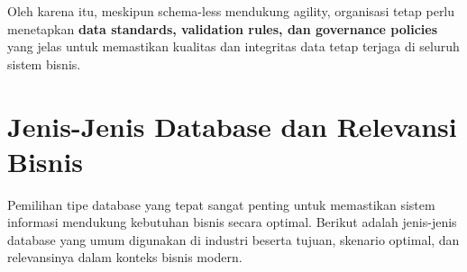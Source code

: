 Oleh karena itu, meskipun schema-less mendukung agility, organisasi tetap perlu menetapkan \textbf{data standards, validation rules, dan governance policies} yang jelas untuk memastikan kualitas dan integritas data tetap terjaga di seluruh sistem bisnis.



\section{Jenis-Jenis Database dan Relevansi Bisnis}

Pemilihan tipe database yang tepat sangat penting untuk memastikan sistem informasi mendukung kebutuhan bisnis secara optimal. Berikut adalah jenis-jenis database yang umum digunakan di industri beserta tujuan, skenario optimal, dan relevansinya dalam konteks bisnis modern.

